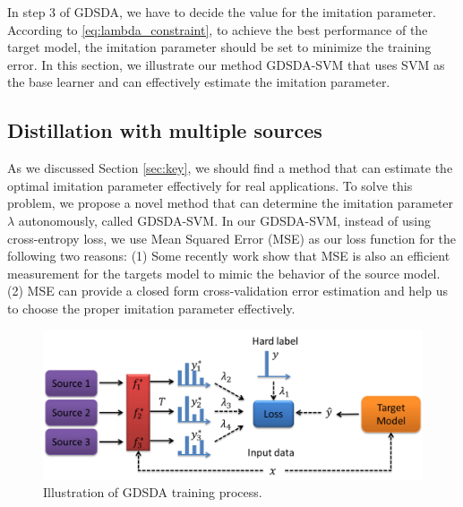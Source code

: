 In step 3 of GDSDA, we have to decide the value for the imitation parameter. According to \eqref{eq:lambda_constraint}, to achieve the best performance of the target model, the imitation parameter should be set to minimize the training error. In this section, we illustrate our method GDSDA-SVM that uses SVM as the base learner and can effectively estimate the imitation parameter.
\subsection{Distillation with multiple sources}
As we discussed Section \ref{sec:key}, we should find a method that can estimate the optimal imitation parameter effectively for real applications. 
To solve this problem, we propose a novel method that can determine the imitation parameter $\lambda$ autonomously, called GDSDA-SVM. In our GDSDA-SVM, instead of using cross-entropy loss, we use Mean Squared Error (MSE) as our loss function for the following two reasons: (1) Some recently work \cite{ba2014deep,luo2016face,romero2014fitnets,urban2016deep} show that MSE is also an efficient measurement for the targets model to mimic the behavior of the source model. (2) MSE can provide a closed form cross-validation error estimation and help us to choose the proper imitation parameter effectively. 

\begin{figure}
\centering
\includegraphics[scale=.4]{figure/multi-GDDA.png}
\caption{Illustration of GDSDA training process.}
\end{figure}

